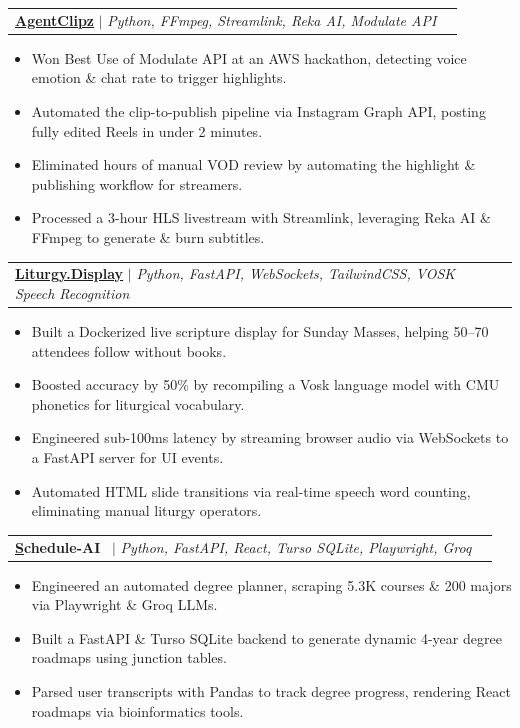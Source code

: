 \documentclass[letterpaper,11pt]{article}
\makeatletter
\newcommand{\resumeItem}[1]{
  \item\small{
    {#1 \vspace{-2pt}}
  }
}
\newcommand{\resumeProjectHeading}[2]{
    \item
    \begin{tabular*}{0.97\textwidth}{l@{\extracolsep{\fill}}r}
      \small#1 & #2 \\
    \end{tabular*}\vspace{-7pt}
}
\newcommand{\resumeItemListStart}{\begin{itemize}}
\newcommand{\resumeItemListEnd}{\end{itemize}\vspace{-5pt}}
\makeatother
\begin{document}
\resumeProjectHeading
{\textbf{\href{https://github.com/epicgdog/agentclipz}{AgentClipz}}  $|$ \emph{Python, FFmpeg, Streamlink, Reka AI, Modulate API}}{}
\resumeItemListStart
\resumeItem{Won Best Use of Modulate API at an AWS hackathon, detecting voice emotion \& chat rate to trigger highlights.}
\resumeItem{Automated the clip-to-publish pipeline via Instagram Graph API, posting fully edited Reels in under 2 minutes.}
\resumeItem{Eliminated hours of manual VOD review by automating the highlight \& publishing workflow for streamers.}
\resumeItem{Processed a 3-hour HLS livestream with Streamlink, leveraging Reka AI \& FFmpeg to generate \& burn subtitles.}
\resumeItemListEnd
\resumeProjectHeading
{\textbf{\href{https://github.com/adover06/liturgy.display}{Liturgy.Display}}  $|$ \emph{Python, FastAPI, WebSockets, TailwindCSS, VOSK Speech Recognition}}{}
\resumeItemListStart
\resumeItem{Built a Dockerized live scripture display for Sunday Masses, helping 50--70 attendees follow without books.}
\resumeItem{Boosted accuracy by 50\% by recompiling a Vosk language model with CMU phonetics for liturgical vocabulary.}
\resumeItem{Engineered sub-100ms latency by streaming browser audio via WebSockets to a FastAPI server for UI events.}
\resumeItem{Automated HTML slide transitions via real-time speech word counting, eliminating manual liturgy operators.}
\resumeItemListEnd


\resumeProjectHeading
{\textbf{\href{https://github.com/epicgdog/schedule-ai}Schedule-AI} \ $|$ \emph{Python, FastAPI, React, Turso SQLite, Playwright, Groq}}{}
\resumeItemListStart
\resumeItem{Engineered an automated degree planner, scraping 5.3K courses \& 200 majors via Playwright \& Groq LLMs.}
\resumeItem{Built a FastAPI \& Turso SQLite backend to generate dynamic 4-year degree roadmaps using junction tables.}
\resumeItem{Parsed user transcripts with Pandas to track degree progress, rendering React roadmaps via bioinformatics tools.}
\resumeItemListEnd
\end{document}
